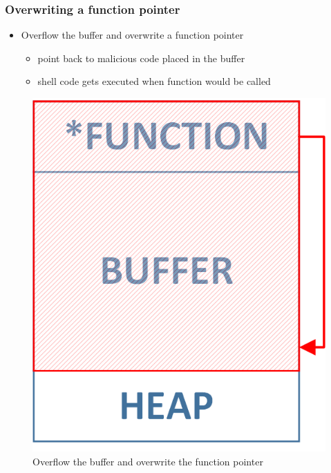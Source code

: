 \documentclass[12pt,titlepage,a4paper]{report}
\begin{document}
	\subsubsection{Overwriting a function pointer}
	\begin{itemize}
		\item Overflow the buffer and overwrite a function pointer
		\begin{itemize}
			\item point back to malicious code placed in the buffer
			\item shell code gets executed when function would be called
		\end{itemize}
	\end{itemize}

	\begin{figure}[h]
		\centering
		\includegraphics*[scale=0.75]{assets/img/HeapBufferOverflowFunctionPointer.png}
		\caption{\label{img:heapBufferOverflowFuncionPointer}Overflow the buffer and overwrite the function pointer}
	\end{figure}
	
\end{document}
